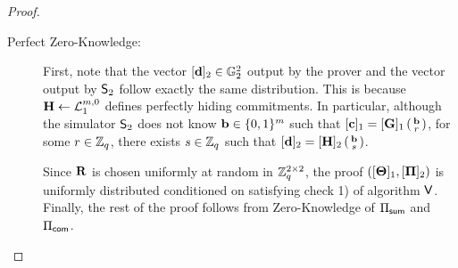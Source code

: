\begin{proof}
\begin{description}
\item[Perfect Zero-Knowledge:] First, note that the vector $[\mathbf{d}]_2 \in \mathbb{G}_2^2$ output by the prover and the vector output by $\mathsf{S}_2$ follow exactly the same distribution. This is because $\mathbf{{H}}\gets\mathcal{L}_1^{m,0}$ defines perfectly hiding commitments. In particular, although the simulator $\mathsf{S}_2$ does not know $\mathbf{b} \in \{0,1\}^{m}$ such that $[\mathbf{c}]_1=[\mathbf{{G}}]_1\left(\begin{smallmatrix}\mathbf{b}\\r\end{smallmatrix}\right)$, for some $r\in\mathbb{Z}_q$, 
there exists $s \in \mathbb{Z}_q$ such that $[\mathbf{d}]_2=[\mathbf{{H}}]_2\left(\begin{smallmatrix}\mathbf{b}\\ s\end{smallmatrix}\right)$. 

Since $\mathbf{{R}}$ is chosen uniformly at random in $\mathbb{Z}_q^{2 \times 2}$, the proof $([\mathbf{{\Theta}}]_1, [\mathbf{{\Pi}}]_2)$ is uniformly distributed conditioned on satisfying check 1) of algorithm $\mathsf{V}$.
 Finally, the rest of the proof follows from Zero-Knowledge of $\Pi_{\mathsf{sum}}$ and $\Pi_{\mathsf{com}}$.
\end{description}
\end{proof}

